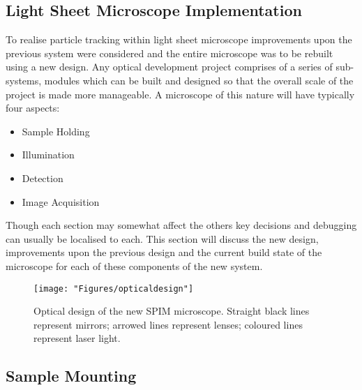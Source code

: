 \documentclass[10pt,a4paper]{report}
\begin{document}
\begin{spacing}{1.5}


\section{Light Sheet Microscope Implementation}

To realise particle tracking within light sheet microscope improvements upon the previous system were considered and the entire microscope was to be rebuilt using a new design. Any optical development project comprises of a series of sub-systems, modules which can be built and designed so that the overall scale of the project is made more manageable. A microscope of this nature will have typically four aspects:

\begin{itemize}
	\item Sample Holding
	\item Illumination
	\item Detection
	\item Image Acquisition
\end{itemize}

Though each section may somewhat affect the others key decisions and debugging can usually be localised to each. This section will discuss the new design, improvements upon the previous design and the current build state of the microscope for each of these components of the new system.

%



	\begin{landscape}
\begin{figure}
\centering
\texttt{[image: "Figures/opticaldesign"]}
\caption[Full optical design of new SPIM]{Optical design of the new SPIM microscope. Straight black lines represent mirrors; arrowed lines represent lenses; coloured lines represent laser light.}
\label{fig:opticaldesign}
\end{figure}
	\end{landscape}

\subsection{Sample Mounting}


\end{spacing}
\end{document}
